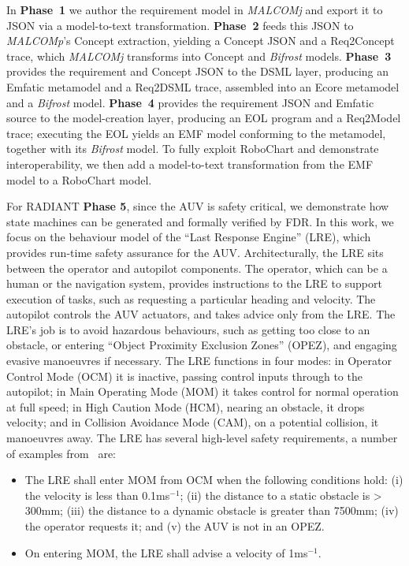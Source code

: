 
In \textbf{Phase~1} we author the requirement model in \textit{MALCOMj} and export it to JSON via a model-to-text transformation. \textbf{Phase~2} feeds this JSON to \textit{MALCOMp}'s Concept extraction, yielding a Concept JSON and a Req2Concept trace, which \textit{MALCOMj} transforms into Concept and \textit{Bifrost} models.
\textbf{Phase~3} provides the requirement and Concept JSON to the DSML layer, producing an Emfatic metamodel and a Req2DSML trace, assembled into an Ecore metamodel and a \textit{Bifrost} model.
\textbf{Phase~4} provides the requirement JSON and Emfatic source to the model-creation layer, producing an EOL program and a Req2Model trace; executing the EOL yields an EMF model conforming to the metamodel, together with its \textit{Bifrost} model.
To fully exploit RoboChart and demonstrate interoperability, we then add a model-to-text transformation from the EMF model to a RoboChart model.

For RADIANT \textbf{Phase 5}, since the AUV is safety critical, we demonstrate how state machines can be generated and formally verified by FDR.
In this work, we focus on the behaviour model of the ``Last Response Engine'' (LRE), which provides run-time safety assurance for the AUV.
Architecturally, the LRE sits between the operator and autopilot components.
The operator, which can be a human or the navigation system, provides instructions to the LRE to support execution of tasks, such as requesting a particular heading and velocity.
The autopilot controls the AUV actuators, and takes advice only from the LRE.
The LRE’s job is to avoid hazardous behaviours, such as getting too close to an obstacle, or entering ``Object Proximity Exclusion Zones'' (OPEZ), and engaging evasive manoeuvres if necessary.
The LRE functions in four modes: in Operator Control Mode (OCM) it is inactive, passing control inputs through to the autopilot; in Main Operating Mode (MOM) it takes control for normal operation at full speed; in High Caution Mode (HCM), nearing an obstacle, it drops velocity; and in Collision Avoidance Mode (CAM), on a potential collision, it manoeuvres away.
The LRE has several high-level safety requirements, a number of examples from~\cite{foster2020formal} are:
\begin{itemize}
    \item The LRE shall enter MOM from OCM when the following conditions hold: (i) the velocity is less than 0.1ms$^{-1}$; (ii) the distance to a static obstacle is > 300mm; (iii) the distance to a dynamic obstacle is greater than 7500mm; (iv) the operator requests it; and (v) the AUV is not in an OPEZ.
    \item On entering MOM, the LRE shall advise a velocity of 1ms$^{-1}$.
\end{itemize}

